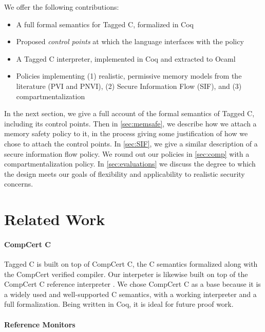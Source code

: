 \documentclass[acmsmall,review,anonymous]{acmart}\settopmatter{printfolios=true,printccs=false,printacmref=false}
\begin{document}
We offer the following contributions:

\begin{itemize}
\item A full formal semantics for Tagged C, formalized in Coq
\item Proposed {\em control points} at which the language interfaces with the policy
\item A Tagged C interpreter, implemented in Coq and extracted to Ocaml
\item Policies implementing (1) realistic, permissive memory models from the literature (PVI and PNVI),
  (2) Secure Information Flow (SIF), and (3) compartmentalization
\end{itemize}

In the next section, we give a full account of the formal semantics of Tagged C,
including its control points. Then in \cref{sec:memsafe}, we describe how we attach
a memory safety policy to it, in the process giving some justification of how we chose to
attach the control points. In \cref{sec:SIF}, we give a similar description of
a secure information flow policy. We round out our policies in \cref{sec:comp} with
a compartmentalization policy. In \cref{sec:evaluations} we discuss the degree to
which the design meets our goals of flexibility and applicability to realistic
security concerns.

\section{Related Work}

\paragraph{CompCert C}

Tagged C is built on top of CompCert C, the C semantics formalized along with the CompCert verified compiler.
Our interpeter is likewise built on top of the CompCert C reference interpreter \cite{Leroy09:CompCert}.
We chose CompCert C as a base because it is a widely used and well-supported C semantics, with a working
interpreter and a full formalization. Being written in Coq, it is ideal for future proof work.

\paragraph{Reference Monitors}
\end{document}
